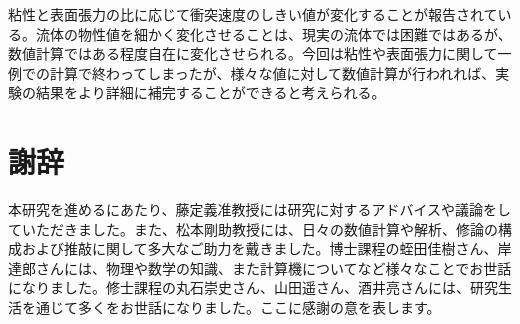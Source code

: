 \documentclass[]{jsarticle}
\begin{document}
粘性と表面張力の比に応じて衝突速度のしきい値が変化することが報告されている\cite{Duez2007}。流体の物性値を細かく変化させることは、現実の流体では困難ではあるが、数値計算ではある程度自在に変化させられる。今回は粘性や表面張力に関して一例での計算で終わってしまったが、様々な値に対して数値計算が行われれば、実験の結果をより詳細に補完することができると考えられる。
\newpage

\section{謝辞}
本研究を進めるにあたり、藤定義准教授には研究に対するアドバイスや議論をしていただきました。また、松本剛助教授には、日々の数値計算や解析、修論の構成および推敲に関して多大なご助力を戴きました。博士課程の蛭田佳樹さん、岸達郎さんには、物理や数学の知識、また計算機についてなど様々なことでお世話になりました。修士課程の丸石崇史さん、山田遥さん、酒井亮さんには、研究生活を通じて多くをお世話になりました。ここに感謝の意を表します。
\newpage



\end{document}

